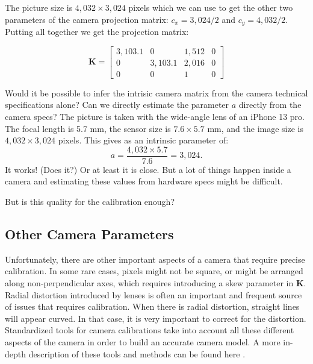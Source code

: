 The picture size is $4{,}032 \times 3{,}024$ pixels which we can use to get the other two parameters of the camera projection matrix: $c_x=3{,}024/2$ and $c_y=4{,}032/2$. Putting all together we get the projection matrix:

\begin{equation}
    \mathbf{K} =             
    \begin{bmatrix}
    3{,}103.1 & 0 & 1{,}512 & 0 \\
    0 & 3{,}103.1 & 2{,}016 & 0 \\
    0 & 0 & 1 & 0
    \end{bmatrix}
    \label{eq:intrinsic}
\end{equation}

Would it be possible to infer the intrisic camera matrix from the camera technical specifications alone?  Can we directly estimate the parameter $a$ directly from the camera specs? The picture is taken with the wide-angle lens of an iPhone 13 pro. The focal length is 5.7 mm, the sensor size is $7.6 \times 5.7$ mm, and the image size is $4{,}032 \times 3{,}024$ pixels. This gives as an intrinsic parameter of:
\begin{equation}
a = \frac{4{,}032 \times 5.7}{7.6} = 3{,}024. 
\end{equation}
It works! (Does it?) Or at least it is close. But a lot of things happen inside a camera and estimating these values from hardware specs might be difficult.

But is this quality for the calibration enough? 


\subsection{Other Camera Parameters}

Unfortunately, there are other important aspects of a camera that require precise calibration. In some rare cases, pixels might not be square, or might be arranged along non-perpendicular axes, which requires introducing a skew parameter in $\mathbf{K}$. 
Radial distortion introduced by lenses is often an important and frequent source of issues that requires calibration. When there is radial distortion, straight lines will appear curved. In that case, it is very important to correct for the distortion. Standardized tools for camera calibrations take into account all these different aspects of the camera in order to build an accurate camera model. A more in-depth description of these tools and methods can be found here \cite{Zhang1999,Zhang2000}.



